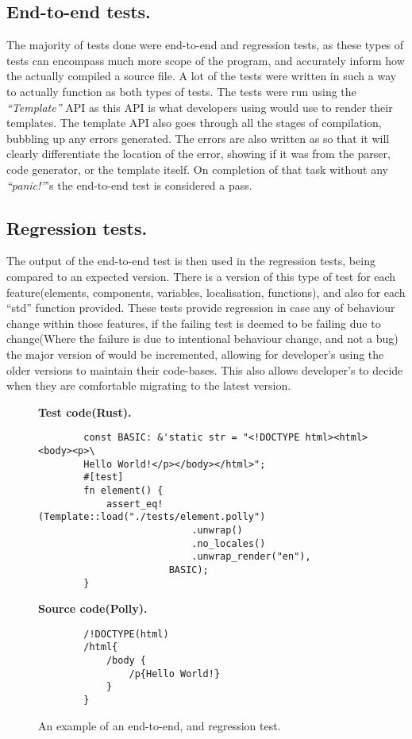 \newpage
\subsection{End-to-end tests.}
The majority of tests done were end-to-end and regression tests, as these types of tests can encompass much more scope of the program, and accurately inform how the \compiler{} actually compiled a source file. A lot of the tests were written in such a way to actually function as both types of tests. The tests were run using the \textit{``Template''} API as this API is what developers using \languageName{} would use to render their templates. The template API also goes through all the stages of compilation, bubbling up any errors generated. The errors are also written as so that it will clearly differentiate the location of the error, showing if it was from the parser, code generator, or the template itself. On completion of that task without any \textit{``panic!''}'s the end-to-end test is considered a pass.
\newpage
\subsection{Regression tests.}
The output of the end-to-end test is then used in the regression tests, being compared to an expected  version. There is a version of this type of test for each feature(elements, components, variables, localisation, functions), and also for each ``std'' function provided. These tests provide regression in case any of behaviour change within those features, if the failing test is deemed to be failing due to change(Where the failure is due to intentional behaviour change, and not a bug) the major version of \languageName{} would be incremented, allowing for developer's using the older versions to maintain their code-bases. This also allows developer's to decide when they are comfortable migrating to the latest version.

\begin{figure}[!hbtp]
    \Large{\textbf{Test code(Rust).}}\normalsize{}
    \begin{verbatim}
        const BASIC: &'static str = "<!DOCTYPE html><html><body><p>\ 
        Hello World!</p></body></html>";
        #[test]
        fn element() {
            assert_eq!(Template::load("./tests/element.polly")
                           .unwrap()
                           .no_locales()
                           .unwrap_render("en"),
                       BASIC);
        }
    \end{verbatim}
    \Large{\textbf{Source code(Polly).}}\normalsize{}
    \begin{verbatim}
        /!DOCTYPE(html)
        /html{
            /body {
                /p{Hello World!}
            }
        }
    \end{verbatim}
    \caption{An example of an end-to-end, and regression test.}
\end{figure}